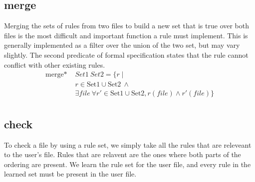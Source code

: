 \subsection{merge}
  Merging the sets of rules from two files to build a new set that is true over both files is the most difficult and important function a rule must implement.
  This is generally implemented as a filter over the union of the two set, but may vary slightly.
  The second predicate of formal specification states that the rule cannot conflict with other existing rules.
  \begin{align*}
  \text{merge* }& Set1 \: Set2= \{r \mid \\
    & r \in \text{Set1} \cup \text{Set2}\ \land \\
    & \exists file\ \forall r' \in \text{Set1} \cup \text{Set2}, r(file) \land r'(file) \} \\
  \end{align*}

\subsection{check}
  To check a file by using a rule set, we simply take all the rules that are releveant to the user's file.
  Rules that are relavent are the ones where both parts of the ordering are present.
  We learn the rule set for the user file, and every rule in the learned set must be present in the user file.

